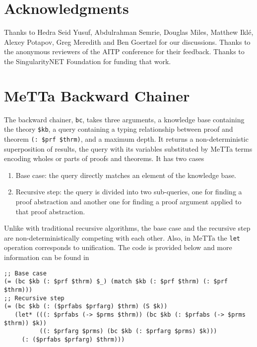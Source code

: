 \documentclass{easychair}
\begin{document}

\section{Acknowledgments}

Thanks to Hedra Seid Yusuf, Abdulrahman Semrie, Douglas Miles, Matthew
Ikl\'e, Alexey Potapov, Greg Meredith and Ben Goertzel for our
discussions.  Thanks to the anonymous reviewers of the AITP conference
for their feedback.  Thanks to the SingularityNET Foundation for
funding that work.


\newpage


\label{sect:bib}
%
%
%


\newpage

\appendix
\section{MeTTa Backward Chainer}
\label{app:metta-backward-chainer}

The backward chainer, \texttt{bc}, takes three arguments, a knowledge
base containing the theory \texttt{\$kb}, a query containing a typing
relationship between proof and theorem \texttt{(: \$prf \$thrm)}, and
a maximum depth.  It returns a non-deterministic superposition of
results, the query with its variables substituted by MeTTa terms
encoding wholes or parts of proofs and theorems.  It has two cases
\begin{enumerate}
\item Base case: the query directly matches an element of the
  knowledge base.
\item Recursive step: the query is divided into two sub-queries, one
  for finding a proof abstraction and another one for finding a proof
  argument applied to that proof abstraction.
\end{enumerate}
Unlike with traditional recursive algorithms, the base case and the
recursive step are non-deterministically competing with each other.
Also, in MeTTa the \texttt{let} operation corresponds to unification.
The code is provided below and more information can be found
in~\cite{Geisweiller2024ICM} \small{
\begin{verbatim}
;; Base case
(= (bc $kb (: $prf $thrm) $_) (match $kb (: $prf $thrm) (: $prf $thrm)))
;; Recursive step
(= (bc $kb (: ($prfabs $prfarg) $thrm) (S $k))
   (let* (((: $prfabs (-> $prms $thrm)) (bc $kb (: $prfabs (-> $prms $thrm)) $k))
          ((: $prfarg $prms) (bc $kb (: $prfarg $prms) $k)))
     (: ($prfabs $prfarg) $thrm)))
\end{verbatim}
}
\end{document}

